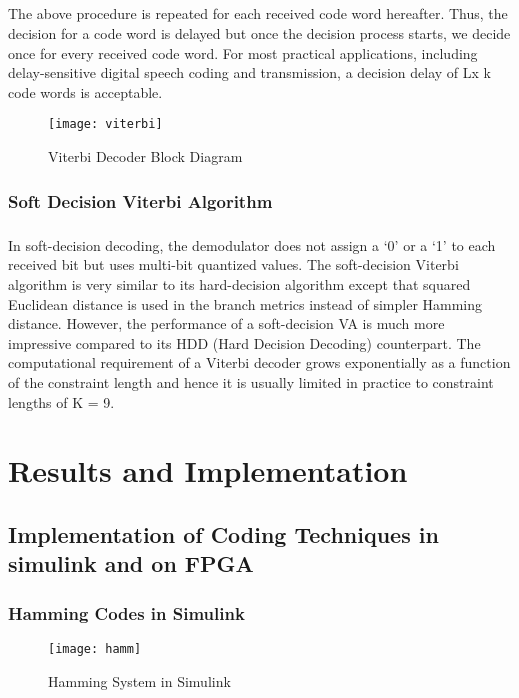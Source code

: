 \documentclass[14pt]{report}
\begin{document}
{\paragraph{} The above procedure is repeated for each received code word hereafter. Thus, the decision for a code word is delayed but once the decision process starts, we decide once for every received code word. For most practical applications, including delay-sensitive digital speech coding and transmission, a decision delay of Lx k code words is acceptable.
\begin{figure}[ht]
\centering
\texttt{[image: viterbi]}
\caption{Viterbi Decoder Block Diagram}
\end{figure}
\subsection{Soft Decision Viterbi Algorithm}
\paragraph{} In soft-decision decoding, the demodulator does not assign a ‘0’ or a ‘1’ to each received bit but uses multi-bit quantized values. The soft-decision Viterbi algorithm is very similar to its hard-decision algorithm except that squared Euclidean distance is used in the branch metrics instead of simpler Hamming distance. However, the performance of a soft-decision VA is much more impressive compared to its HDD (Hard Decision Decoding) counterpart. The computational requirement of a Viterbi decoder grows exponentially as a function of the constraint length and hence it is usually limited in practice to constraint lengths of K = 9.
\chapter{Results and Implementation}
\thispagestyle{fancy}

\section{Implementation of Coding Techniques in simulink and on FPGA}
\subsection{Hamming Codes in Simulink}
\begin{figure}[ht]
\centering
\texttt{[image: hamm]}
\caption{Hamming System in Simulink}
\end{figure}

}
\end{document}
